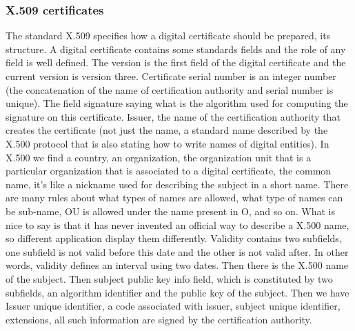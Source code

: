 \documentclass[11pt]{article}
\begin{document}
\subsubsection{X.509 certificates}
The standard X.509 specifies how a digital certificate should be prepared, its structure. A digital certificate contains some standards fields and the role of any field is well defined. The version is the first field of the digital certificate and the current version is version three. Certificate serial number is an integer number (the concatenation of the name of certification authority and serial number is unique). The field signature saying what is the algorithm used for computing the signature on this certificate. Issuer, the name of the certification authority that creates the certificate (not just the name, a
standard name described by the X.500 protocol that is also stating how to write names of digital entities). In X.500 we find a country, an organization, the organization unit that is a particular organization that is associated to a digital certificate, the common name, it's like a nickname used for describing the subject in a short name. There are many rules about what types of names are allowed, what type of names can be sub-name, OU is allowed under the name present in O, and so on. What is nice to say is that it has never invented an official way to describe a X.500 name, so different application display them differently. Validity contains two subfields, one subfield is not valid before this date and the other is not valid after. In other words, validity defines an interval using two dates. Then there is the X.500
name of the subject. Then subject public key info field, which is constituted by two subfields, an algorithm identifier and the public key of the subject. Then we have Issuer unique identifier, a code associated with issuer, subject unique identifier, extensions, all such information are signed by the certification authority.
\end{document}
